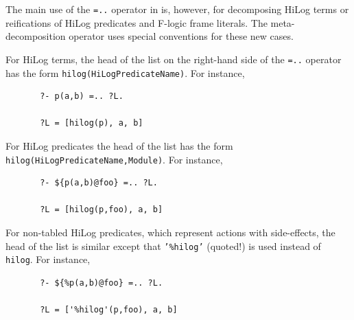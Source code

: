 \documentclass[11pt]{article}
\newcommand{\ERGO}{\mbox{\smaller{\ensuremath{\cal{E}}\smaller{{\sc{RGO}}}}}\xspace}
\newcommand{\FLSYSTEM}{\ERGO}
\begin{document}
The main use of the {\tt =..} operator in \FLSYSTEM is, however, for
decomposing HiLog terms or reifications of HiLog predicates and F-logic
frame literals. The meta-decomposition operator uses special
conventions for these new cases.

For HiLog terms, the head of the list on the right-hand side of the {\tt =..}
operator has the form {\tt hilog(HiLogPredicateName)}. For instance, 
\begin{verbatim}
       ?- p(a,b) =.. ?L.
 
       ?L = [hilog(p), a, b]
\end{verbatim}
For HiLog predicates the head of the list has the form {\tt
  hilog(HiLogPredicateName,Module)}. For instance,
\begin{verbatim}
       ?- ${p(a,b)@foo} =.. ?L.
 
       ?L = [hilog(p,foo), a, b]
\end{verbatim}
For non-tabled HiLog predicates, which represent actions with side-effects,
the head of the list is similar except that {\tt '\%hilog'} (quoted!) is 
used instead of {\tt hilog}.  For instance,
\begin{verbatim}
       ?- ${%p(a,b)@foo} =.. ?L.
 
       ?L = ['%hilog'(p,foo), a, b]
\end{verbatim}
\end{document}
